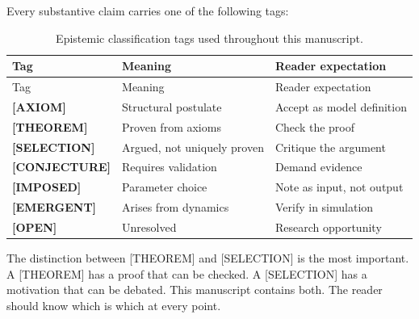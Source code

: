\documentclass[
  11pt,
  letterpaper,
  twoside,
  openany]{book}
\begin{document}
Every substantive claim carries one of the following tags:

\begin{longtable}[]{@{}
  >{\raggedright\arraybackslash}p{}
  >{\raggedright\arraybackslash}p{}
  >{\raggedright\arraybackslash}p{}@{}}
\caption{Epistemic classification tags used throughout this
manuscript.}\tabularnewline
\toprule\noalign{}
\begin{minipage}[b]{\linewidth}\raggedright
Tag
\end{minipage} & \begin{minipage}[b]{\linewidth}\raggedright
Meaning
\end{minipage} & \begin{minipage}[b]{\linewidth}\raggedright
Reader expectation
\end{minipage} \\
\midrule\noalign{}
\endfirsthead
\toprule\noalign{}
\begin{minipage}[b]{\linewidth}\raggedright
Tag
\end{minipage} & \begin{minipage}[b]{\linewidth}\raggedright
Meaning
\end{minipage} & \begin{minipage}[b]{\linewidth}\raggedright
Reader expectation
\end{minipage} \\
\midrule\noalign{}
\endhead
\bottomrule\noalign{}
\endlastfoot
\textbf{{[}AXIOM{]}} & Structural postulate & Accept as model
definition \\
\textbf{{[}THEOREM{]}} & Proven from axioms & Check the proof \\
\textbf{{[}SELECTION{]}} & Argued, not uniquely proven & Critique the
argument \\
\textbf{{[}CONJECTURE{]}} & Requires validation & Demand evidence \\
\textbf{{[}IMPOSED{]}} & Parameter choice & Note as input, not output \\
\textbf{{[}EMERGENT{]}} & Arises from dynamics & Verify in simulation \\
\textbf{{[}OPEN{]}} & Unresolved & Research opportunity \\
\end{longtable}

The distinction between {[}THEOREM{]} and {[}SELECTION{]} is the most
important. A {[}THEOREM{]} has a proof that can be checked. A
{[}SELECTION{]} has a motivation that can be debated. This manuscript
contains both. The reader should know which is which at every point.
\end{document}
